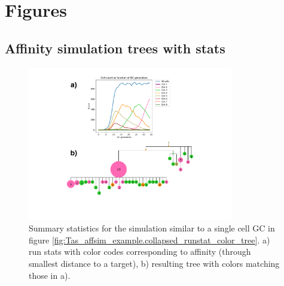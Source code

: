 \chapter{Figures}



\section{Affinity simulation trees with stats}
\begin{figure}[!ht]
    \centering
    \includegraphics[width=0.8\textwidth]{figures/Tas_affsim_example_with_runstats.pdf}
    \caption{
        \label{fig:Tas_affsim_example_with_runstats}
        Summary statistics for the simulation similar to a single cell GC in figure \ref{fig:Tas_affsim_example.collapsed_runstat_color_tree}. a) run stats with color codes corresponding to affinity (through smallest distance to a target), b) resulting tree with colors matching those in a).
    }
\end{figure}





